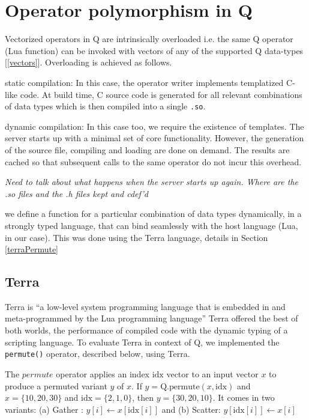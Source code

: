 \section{Operator polymorphism in Q}

Vectorized operators in Q are intrinsically overloaded i.e. the same Q operator (Lua function) can be invoked with vectors of any of the supported Q data-types [\ref{vectors}].
Overloading is achieved as follows.
\be
\item static compilation: In this case, the operator writer implements
  templatized C-like code. At build time, C source code is generated for
  all relevant combinations of data types which is then compiled into a 
  single \verb+.so+.
\item dynamic compilation: 
  In this case too, we require the existence of templates. 
  The server starts up with a minimal set of core functionality. 
  However, the generation of the source file, compiling and loading
  are done on demand. The results are cached
  so that subsequent calls to the same operator do not incur this overhead.

  {\em Need to talk about what happens when  the server starts up again. Where
  are the .so files and the .h files kept and cdef'd}

\item we define a function for a particular combination of data types
  dynamically, in a strongly typed language, that can bind seamlessly
  with the host language (Lua, in our case). This was done using the Terra
  language, details in Section \ref{terraPermute} 
  \ee

\subsection{Terra} 
Terra is ``a low-level system programming language that is embedded in and
meta-programmed by the Lua programming language'' \cite{devito:terra}
Terra offered the best of both worlds, the performance of compiled code
with the dynamic typing of a scripting language.
To evaluate Terra in context of Q, we implemented the {\tt permute()} operator, described below, using Terra.

The \(permute\) operator applies an index \(\mathrm{idx}\) vector to an input vector \(x\)
to produce a permuted variant \(y\) of \(x\). 
If \(y = \mathrm{Q.permute}(x, \mathrm{idx})\) and \(x = \{10, 20, 30\}\) and
\(\mathrm{idx} = \{2, 1,
0\}\), then \(y = \{30, 20, 10\}\).
It comes in two variants:
(a) 
Gather : \(y[i] \leftarrow x[\mathrm{idx}[i]]\) and (b) 
Scatter: \(y[\mathrm{idx}[i]] \leftarrow x[i]\) 


